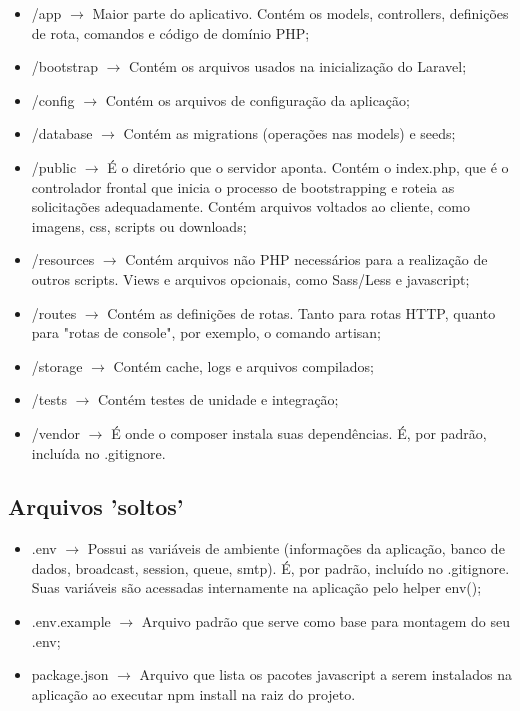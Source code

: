 \documentclass[
12pt,				%
openany,			%
twoside,			%
a4paper,			%
english,			%
french,				%
spanish,			%
brazil,				%
]{abntex2}
\begin{document}
\begin{itemize}
    \item /app $\rightarrow$ Maior parte do aplicativo. Contém os models, controllers, definições de rota, comandos e código de domínio PHP;

    \item /bootstrap $\rightarrow$ Contém os arquivos usados na inicialização do Laravel;

    \item /config $\rightarrow$ Contém os arquivos de configuração da aplicação;

    \item /database $\rightarrow$ Contém as migrations (operações nas models) e seeds;

    \item /public $\rightarrow$ É o diretório que o servidor aponta. Contém o index.php, que é o controlador frontal que inicia o processo de bootstrapping e roteia as solicitações adequadamente. Contém arquivos voltados ao cliente, como imagens, css, scripts ou downloads;

    \item /resources $\rightarrow$ Contém arquivos não PHP necessários para a realização de outros scripts. Views e arquivos opcionais, como Sass/Less e javascript;

    \item /routes $\rightarrow$ Contém as definições de rotas. Tanto para rotas HTTP, quanto para "rotas de console", por exemplo, o comando artisan;

    \item /storage $\rightarrow$ Contém cache, logs e arquivos compilados;

    \item /tests $\rightarrow$ Contém testes de unidade e integração;

    \item /vendor $\rightarrow$ É onde o composer instala suas dependências. É, por padrão, incluída no .gitignore.
\end{itemize}

\subsection{Arquivos 'soltos'}

\begin{itemize}
    \item .env $\rightarrow$ Possui as variáveis de ambiente (informações da aplicação, banco de dados, broadcast, session, queue, smtp). É, por padrão, incluído no .gitignore. Suas variáveis são acessadas internamente na aplicação pelo helper env();

    \item .env.example $\rightarrow$ Arquivo padrão que serve como base para montagem do seu .env;

    \item package.json $\rightarrow$ Arquivo que lista os pacotes javascript a serem instalados na aplicação ao executar npm install na raiz do projeto.

\end{itemize}
\end{document}
